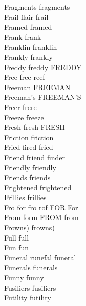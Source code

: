 Fragments fragments\\
Frail flair frail\\
Framed framed\\
Frank frank\\
Franklin franklin\\
Frankly frankly\\
Freddy freddy FREDDY\\
Free free reef\\
Freeman FREEMAN\\
Freeman's FREEMAN'S\\
Freer frere\\
Freeze freeze\\
Fresh fresh FRESH\\
Friction friction\\
Fried fired fried\\
Friend friend finder\\
Friendly friendly\\
Friends friends\\
Frightened frightened\\
Frillies frillies\\
Fro for fro rof FOR For\\
From form FROM from\\
Frowns) frowns)\\
Full full\\
Fun fun\\
Funeral runefal funeral\\
Funerals funerals\\
Funny funny\\
Fusiliers fusiliers\\
Futility futility\\

